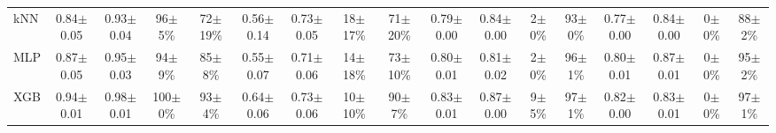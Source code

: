\begin{table}[t]
\begin{tabular}{@{}lcccccccccccccccc@{}}
    kNN & 0.84{\scriptsize$\pm$0.05} & 0.93{\scriptsize$\pm$0.04} & 96{\scriptsize$\pm$5}\% & 72{\scriptsize$\pm$19}\% & 0.56{\scriptsize$\pm$0.14} & 0.73{\scriptsize$\pm$0.05} & 18{\scriptsize$\pm$17}\% & 71{\scriptsize$\pm$20}\% & 0.79{\scriptsize$\pm$0.00} & 0.84{\scriptsize$\pm$0.00} & 2{\scriptsize$\pm$0}\% & 93{\scriptsize$\pm$0}\% & 0.77{\scriptsize$\pm$0.00} & 0.84{\scriptsize$\pm$0.00} & 0{\scriptsize$\pm$0}\% & 88{\scriptsize$\pm$2}\% \\
    MLP & 0.87{\scriptsize$\pm$0.05} & 0.95{\scriptsize$\pm$0.03} & 94{\scriptsize$\pm$9}\% & 85{\scriptsize$\pm$8}\% & 0.55{\scriptsize$\pm$0.07} & 0.71{\scriptsize$\pm$0.06} & 14{\scriptsize$\pm$18}\% & 73{\scriptsize$\pm$10}\% & 0.80{\scriptsize$\pm$0.01} & 0.81{\scriptsize$\pm$0.02} & 2{\scriptsize$\pm$0}\% & 96{\scriptsize$\pm$1}\% & 0.80{\scriptsize$\pm$0.01} & 0.87{\scriptsize$\pm$0.01} & 0{\scriptsize$\pm$0}\% & 95{\scriptsize$\pm$2}\% \\
    XGB & 0.94{\scriptsize$\pm$0.01} & 0.98{\scriptsize$\pm$0.01} & 100{\scriptsize$\pm$0}\% & 93{\scriptsize$\pm$4}\% & 0.64{\scriptsize$\pm$0.06} & 0.73{\scriptsize$\pm$0.06} & 10{\scriptsize$\pm$10}\% & 90{\scriptsize$\pm$7}\% & 0.83{\scriptsize$\pm$0.01} & 0.87{\scriptsize$\pm$0.00} & 9{\scriptsize$\pm$5}\% & 97{\scriptsize$\pm$1}\% & 0.82{\scriptsize$\pm$0.00} & 0.83{\scriptsize$\pm$0.01} & 0{\scriptsize$\pm$0}\% & 97{\scriptsize$\pm$1}\% \\
    \bottomrule
  \end{tabular}
\end{table}

